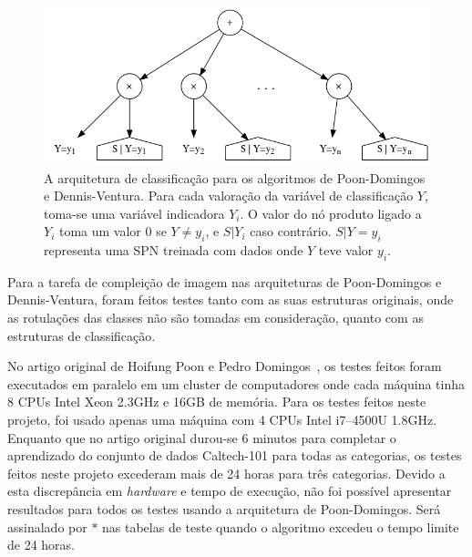 \documentclass[12pt]{article}
\theoremstyle{plain}
\numberwithin{equation}{section}
\begin{document}
\begin{figure}[h]
  \centering\includegraphics[scale=0.55]{graphs/classarch.png}
  \captionsetup{justification=raggedright}
  \caption{A arquitetura de classificação para os algoritmos de Poon-Domingos e Dennis-Ventura.
    Para cada valoração da variável de classificação $Y$, toma-se uma variável indicadora $Y_i$.
    O valor do nó produto ligado a $Y_i$ toma um valor 0 se $Y\neq y_i$, e $S|Y_i$ caso contrário.
    $S|Y=y_i$ representa uma SPN treinada com dados onde $Y$ teve valor $y_i$.}
\end{figure}

Para a tarefa de compleição de imagem nas arquiteturas de Poon-Domingos e Dennis-Ventura, foram
feitos testes tanto com as suas estruturas originais, onde as rotulações das classes não são
tomadas em consideração, quanto com as estruturas de classificação.

No artigo original de Hoifung Poon e Pedro Domingos~\cite{poon-domingos}, os testes feitos foram
executados em paralelo em um cluster de computadores onde cada máquina tinha 8 CPUs Intel Xeon
2.3GHz e 16GB de memória. Para os testes feitos neste projeto, foi usado apenas uma máquina com 4
CPUs Intel i7--4500U 1.8GHz. Enquanto que no artigo original durou-se 6 minutos para completar o
aprendizado do conjunto de dados Caltech-101 para todas as categorias, os testes feitos neste
projeto excederam mais de 24 horas para três categorias. Devido a esta discrepância em
\textit{hardware} e tempo de execução, não foi possível apresentar resultados para todos os testes
usando a arquitetura de Poon-Domingos. Será assinalado por $\ast$ nas tabelas de teste quando o
algoritmo excedeu o tempo limite de 24 horas.
\end{document}
